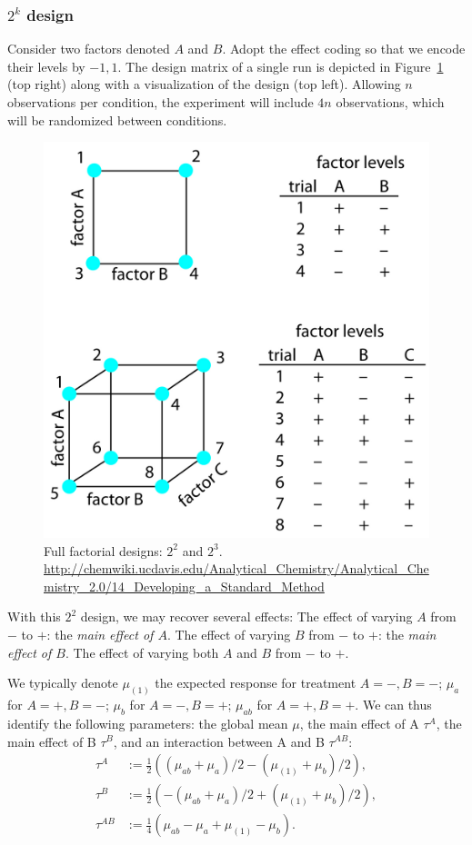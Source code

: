 \subsubsection{$2^k$ design}
Consider two factors denoted $A$ and $B$.
Adopt the effect coding so that we encode their levels by $-1,1$.
The design matrix of a single run is depicted in Figure~\ref{fig:full_factorial} (top right) along with a visualization of the design (top left).
Allowing $n$ observations per condition, the experiment will include $4n$ observations, which will be randomized between conditions.
\begin{figure}[ht]
\centering
\includegraphics[width=0.7\linewidth, height=0.3\textheight]{art/full_factorial}
\caption[Full Factorial Design]{Full factorial designs: $2^2$ and $2^3$. \newline \url{http://chemwiki.ucdavis.edu/Analytical_Chemistry/Analytical_Chemistry_2.0/14_Developing_a_Standard_Method}}
\label{fig:full_factorial}
\end{figure}
With this $2^2$ design, we may recover several effects:
The effect of varying $A$ from $-$ to $+$: the \emph{main effect of $A$}.
The effect of varying $B$ from $-$ to $+$: the \emph{main effect of $B$}.
The effect of varying both $A$ and $B$ from $-$ to $+$. 

We typically denote $\mu_{(1)}$ the expected response for treatment $A=-,B=-$; 
$\mu_a$ for $A=+,B=-$;
$\mu_b$ for $A=-,B=+$;
$\mu_{ab}$ for $A=+,B=+$.
We can thus identify the following parameters:
the global mean $\mu$, the main effect of A $\tau^A$, the main effect of B $\tau^B$, and an interaction between A and B $\tau^{AB}$:
\begin{align}
	\tau^A &:= \frac{1}{2}\left( (\mu_{ab}+\mu_a)/2- (\mu_{(1)}+\mu_b)/2\right), \\
	\tau^B &:= \frac{1}{2}\left( -(\mu_{ab}+\mu_a)/2 +  (\mu_{(1)}+\mu_b)/2\right), \\
	\tau^{AB} &:= \frac{1}{4}\left( \mu_{ab} - \mu_a +  \mu_{(1)} - \mu_b \right).	
\end{align}



